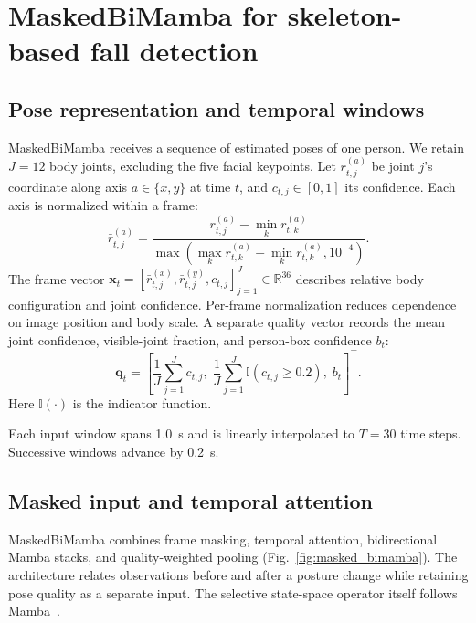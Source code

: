 \section{MaskedBiMamba for skeleton-based fall detection}
\label{sec:method}

\subsection{Pose representation and temporal windows}

MaskedBiMamba receives a sequence of estimated poses of one person. We retain $J=12$ body joints, excluding the five facial keypoints. Let $r_{t,j}^{(a)}$ be joint $j$'s coordinate along axis $a\in\{x,y\}$ at time $t$, and $c_{t,j}\in[0,1]$ its confidence. Each axis is normalized within a frame:
\begin{equation}
    \bar r_{t,j}^{(a)}=
    \frac{r_{t,j}^{(a)}-\min_k r_{t,k}^{(a)}}
    {\max\!\left(\max_k r_{t,k}^{(a)}-\min_k r_{t,k}^{(a)},10^{-4}\right)}.
    \label{eq:pose_normalization}
\end{equation}
The frame vector $\mathbf x_t=[\bar r_{t,j}^{(x)},\bar r_{t,j}^{(y)},c_{t,j}]_{j=1}^{J}\in\mathbb R^{36}$ describes relative body configuration and joint confidence. Per-frame normalization reduces dependence on image position and body scale. A separate quality vector records the mean joint confidence, visible-joint fraction, and person-box confidence $b_t$:
\begin{equation}
    \mathbf q_t=
    \left[\frac{1}{J}\sum_{j=1}^{J}c_{t,j},\;
    \frac{1}{J}\sum_{j=1}^{J}\mathbb I(c_{t,j}\geq0.2),\;b_t\right]^{\!\top}.
    \label{eq:quality_features}
\end{equation}
Here $\mathbb I(\cdot)$ is the indicator function.

Each input window spans 1.0~s and is linearly interpolated to $T=30$ time steps. Successive windows advance by 0.2~s.

\subsection{Masked input and temporal attention}

MaskedBiMamba combines frame masking, temporal attention, bidirectional Mamba stacks, and quality-weighted pooling (Fig.~\ref{fig:masked_bimamba}). The architecture relates observations before and after a posture change while retaining pose quality as a separate input. The selective state-space operator itself follows Mamba~\cite{gu2023mamba}.

